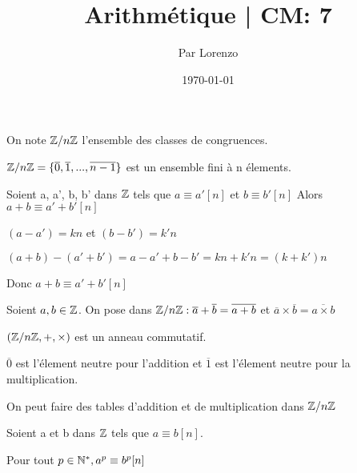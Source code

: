 \documentclass[a4paper, 12pt]{article}
\title{Arithmétique | CM: 7}
\author{Par Lorenzo}
\date{\today}
\begin{document}
\maketitle


\begin{definition}
    On note $\mathbb{Z}/n\mathbb{Z}$ l'ensemble des classes de congruences.

    $\mathbb{Z}/n\mathbb{Z} = \{\overline{0}, \overline{1}, ..., \overline{n-1}\}$ est un ensemble fini à n élements.
\end{definition}

\begin{proposition}
    Soient a, a', b, b' dans $\mathbb{Z}$ tels que $a \equiv a' [n]$ et $b \equiv b' [n]$
    Alors $a + b \equiv a' + b' [n]$
\end{proposition}

\begin{demonstration}
    $(a - a') = kn$ et $(b - b') = k'n$

    $(a + b) - (a' + b') = a - a' + b - b' = kn + k'n = (k + k')n$

    Donc $a + b \equiv a' + b' [n]$
\end{demonstration}

\begin{definition}
    Soient $a, b \in \mathbb{Z}$. On pose dans $\mathbb{Z}/n\mathbb{Z}: \overline{a} + \overline{b} = \overline{a + b}$ et $\overline{a} \times \overline{b} = \overline{a \times b}$
\end{definition}

\begin{proposition}
    $(\mathbb{Z}/n\mathbb{Z}, +, \times)$ est un anneau commutatif.

    $\overline{0}$ est l'élement neutre pour l'addition et $\overline{1}$ est l'élement neutre pour la multiplication.
\end{proposition}

\begin{demonstration}
\end{demonstration}

On peut faire des tables d'addition et de multiplication dans $\mathbb{Z}/n\mathbb{Z}$

\begin{example}
\end{example}

\begin{lemme}
    Soient a et b dans $\mathbb{Z}$ tels que $a \equiv b [n]$.

    Pour tout $p \in \mathbb{N}^*, a^p \equiv b^p [n]$
\end{lemme}
\end{document}

